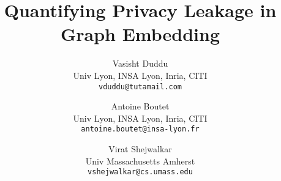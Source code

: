 \documentclass{article}
\begin{document}
\title{Quantifying Privacy Leakage in Graph Embedding}


\author{
Vasisht Duddu \\
Univ Lyon, INSA Lyon, Inria, CITI\\
\texttt{vduddu@tutamail.com}\\
\and
Antoine Boutet\\ 
Univ Lyon, INSA Lyon, Inria, CITI\\
\texttt{antoine.boutet@insa-lyon.fr}\\
\and
Virat Shejwalkar\\
Univ Massachusetts Amherst\\
\texttt{vshejwalkar@cs.umass.edu}\\
}    




\maketitle

\end{document}
